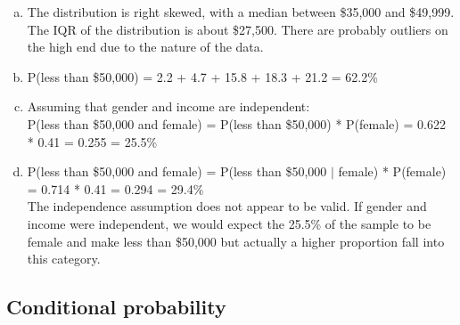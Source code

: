 {
\begin{enumerate}[(a)]
\setlength{\itemsep}{0mm}
\item The distribution is right skewed, with a median between \$35,000 and \$49,999. The IQR of the distribution is about \$27,500. There are probably outliers on the high end due to the nature of the data.
\item P(less than \$50,000) = 2.2 + 4.7 + 15.8 + 18.3 + 21.2 = 62.2\%
\item Assuming that gender and income are independent: \\
P(less than \$50,000 and female) = P(less than \$50,000) * P(female) = 0.622 * 0.41 = 0.255 = 25.5\%
\item P(less than \$50,000 and female)  = P(less than \$50,000 $|$ female) * P(female) = 0.714 * 0.41 = 0.294 = 29.4\% \\
The independence assumption does not appear to be valid. If gender and income were independent, we would expect the 25.5\% of the sample to be female and make less than \$50,000 but actually a higher proportion fall into this category. 
\end{enumerate}
}


\subsection{Conditional probability}




